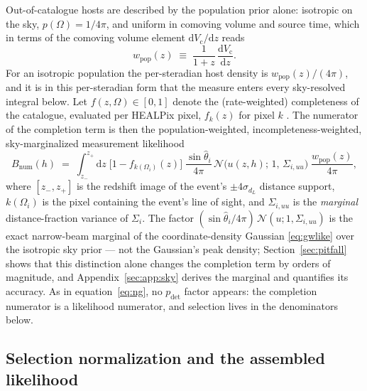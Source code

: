 Out-of-catalogue hosts are described by the population prior alone:
isotropic on the sky, $p(\Omega) = 1/4\pi$, and uniform in comoving
volume and source time, which in terms of the comoving volume element
$\mathrm{d}V_\mathrm{c}/\mathrm{d}z$ reads
\begin{equation}
  w_\mathrm{pop}(z) \;\equiv\;
  \frac{1}{1+z}\,
  \frac{\mathrm{d}V_\mathrm{c}}{\mathrm{d}z}.
  \label{eq:wpop}
\end{equation}
For an isotropic population the per-steradian host density is
$w_\mathrm{pop}(z)/(4\pi)$, and it is in this per-steradian form that
the measure enters every sky-resolved integral below.
Let $f(z, \Omega) \in [0,1]$ denote the (rate-weighted) completeness
of the catalogue, evaluated per HEALPix pixel, $f_k(z)$ for pixel $k$
\citep{Gray:2021sew}.
The numerator of the completion term is then the population-weighted,
incompleteness-weighted, sky-marginalized measurement likelihood
\begin{equation}
  B_\mathrm{num}(h) \;=\;
  \int_{z_-}^{z_+} \mathrm{d}z\;
  \big[1 - f_{k(\Omega_i)}(z)\big]\;
  \frac{\sin\hat\theta_i}{4\pi}\,
  \mathcal{N}\!\big(u(z,h);\, 1,\, \Sigma_{i,uu}\big)\;
  \frac{w_\mathrm{pop}(z)}{4\pi},
  \label{eq:bnum}
\end{equation}
where $[z_-, z_+]$ is the redshift image of the event's
$\pm 4\sigma_{d_L}$ distance support, $k(\Omega_i)$ is the pixel
containing the event's line of sight, and $\Sigma_{i,uu}$ is the
\emph{marginal} distance-fraction variance of $\Sigma_i$.  The factor
$(\sin\hat\theta_i / 4\pi)\,\mathcal{N}(u; 1, \Sigma_{i,uu})$ is the
exact narrow-beam marginal of the coordinate-density Gaussian
\eqref{eq:gwlike} over the isotropic sky prior --- not the Gaussian's
peak density; Section~\ref{sec:pitfall} shows that this distinction
alone changes the completion term by orders of magnitude, and
Appendix~\ref{sec:app:sky} derives the marginal and quantifies its
accuracy.  As in equation~\eqref{eq:ng}, no $p_\mathrm{det}$ factor
appears: the completion numerator is a likelihood numerator, and
selection lives in the denominators below.

\subsection{Selection normalization and the assembled likelihood}
\label{sec:framework:selection}

